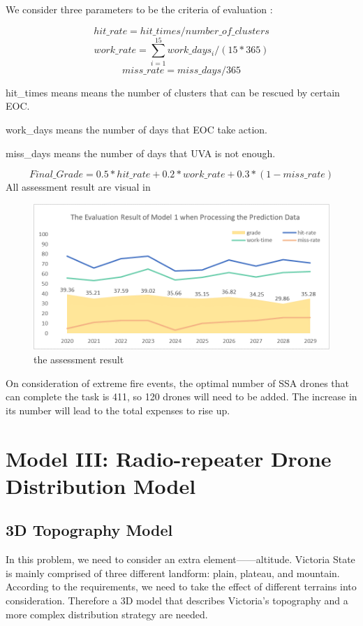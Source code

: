 \documentclass{mcmthesis}
\begin{document}
We consider three parameters to be the criteria of evaluation :

\begin{equation}
	hit\_rate = hit\_times / number\_of\_clusters 
\end{equation}
\begin{equation}
	work\_rate = \sum_{i=1}^{15} work\_days_i / (15*365)
\end{equation}
\begin{equation}
	miss\_rate = miss\_days/365
\end{equation}

hit\_times means means the number of clusters that can be rescued by certain EOC.

work\_days means the number of days that EOC take action.

miss\_days means the number of days that UVA is not enough.

\begin{equation}
	Final\_Grade = 0.5*hit\_rate+0.2*work\_rate+0.3*(1-miss\_rate)
\end{equation}
All assessment result are visual in 
\begin{figure}[h]
	\small
	\centering
	\includegraphics[width=\linewidth]{Figure/Assessment.png}
	\caption{the assessment result} \label{fig:Assessment}
\end{figure}
On consideration of extreme fire events, the optimal number of SSA drones that can complete the task is 411, so 120 drones will need to be added. The increase in its number will lead to the total expenses to rise up.
\section{Model III: Radio-repeater Drone Distribution Model}
\subsection{3D Topography Model}
In this problem, we need to consider an extra element——altitude. 
Victoria State is mainly comprised of three diﬀerent landform: plain, plateau, and mountain. According to the requirements, we need to take the eﬀect of diﬀerent terrains into consideration. Therefore a 3D model that describes Victoria’s topography and a more complex distribution strategy are needed.
\end{document}
